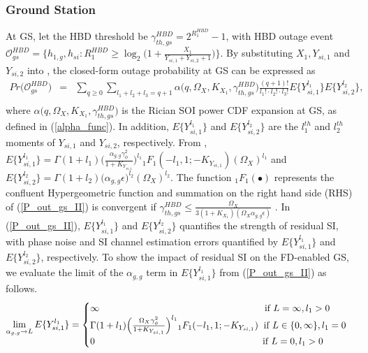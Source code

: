 \subsubsection{Ground Station}
At GS, let the HBD threshold be $\gamma_{th,gs}^{HBD} = 2^{R_{1}^{HBD}}-1$, with HBD outage event $\mathcal{O}_{gs}^{HBD} = \Big\{ h_{1,g}, h_{si} : R_{1}^{HBD} \geq \log_{2}\Big(1 + \frac{X_{1}}{Y_{si,1} + Y_{si,2} + 1}\Big)\Big\}$. By substituting $X_{1}, Y_{si,1}$ and $Y_{si,2}$ into \cite[eq. (12)]{rached2017unified}, the closed-form outage probability at GS can be expressed as
\begin{eqnarray} \label{P_out_gs_II}
Pr\big(\mathcal{O}_{gs}^{HBD}\big) & = & \sum_{q\geq0}\sum_{l_1+l_2+l_3=q+1} \alpha\big(q,\Omega_X,K_{X_1},\gamma_{th,gs}^{HBD}\big) \frac{(q+1)!}{l_1! \cdot l_2! \cdot l_3!} E\{Y_{si,1}^{l_1}\} E\{Y_{si,2}^{l_2}\}, \nonumber\\
\end{eqnarray}
where $\alpha\big(q,\Omega_X,K_{X_1},\gamma_{th,gs}^{HBD}\big)$ is the Rician SOI power CDF expansion at GS, as defined in (\ref{alpha_func}). In addition, $E\{Y_{si,1}^{l_1}\}$ and $E\{Y_{si,2}^{l_2}\}$ are the $l_1^{th}$ and $l_2^{th}$ moments of $Y_{si,1}$ and $Y_{si,2}$, respectively. From \cite[Table II]{rached2017unified}, $E\{Y_{si,1}^{l_1}\} = \Gamma(1+l_1) \Big(\frac{\alpha_{g,g}\gamma_{\phi}^2}{1+K_{Y_{si,1}}}\Big)^{l_1}{}_1{F_1}(-l_1,1;-K_{Y_{si,1}})(\Omega_X)^{l_1}$ and $E\{Y_{si,2}^{l_2}\} = \Gamma(1+l_2) (\alpha_{g,g}\epsilon\big)^{l_2} (\Omega_X)^{l_2}$. The function ${}_1{F_1}(\bullet)$ represents the confluent Hypergeometric function \cite{gradshteyn2014table} and summation on the right hand side (RHS) of (\ref{P_out_gs_II}) is convergent if $\gamma_{th,gs}^{HBD} \leq \frac{\Omega_X}{3(1+K_{X_{1}})(\Omega_X\alpha_{g,g}\epsilon)}$ \cite[eq. (14)]{rached2017unified}. In (\ref{P_out_gs_II}), $E\{Y_{si,1}^{l_1}\}$ and $E\{Y_{si,2}^{l_2}\}$ quantifies the strength of residual SI, with phase noise and SI channel estimation errors quantified by $E\{Y_{si,1}^{l_1}\}$ and $E\{Y_{si,2}^{l_2}\}$, respectively. To show the impact of residual SI on the FD-enabled GS, we evaluate the limit of the $\alpha_{g,g}$ term in $E\{Y_{si,1}^{l_1}\}$ from (\ref{P_out_gs_II}) as follows.
\begin{equation} \label{limit_alpha_g_g}
\lim_{\alpha_{g,g} \to L} E\{Y_{si,1}^{l_1}\} =
  \begin{cases}
    \infty \hspace{6.2cm} \text{if } L=\infty, l_1>0\\
    \Gamma(1+l_1) \Big(\frac{\Omega_X\gamma_{\phi}^2}{1+K_{Y_{si,1}}}\Big)^{l_1}{}_1{F_1}(-l_1,1;-K_{Y_{si,1}}) \hspace{0.2cm} \text{if } L\in\{0,\infty\}, l_1=0 \\
		0 \hspace{6.3cm} \text{if } L=0, l_1>0
  \end{cases}
\end{equation}
